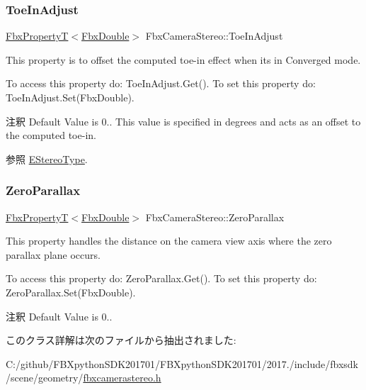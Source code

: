 \subsubsection{\texorpdfstring{Toe\+In\+Adjust}{ToeInAdjust}}
{\footnotesize\ttfamily \hyperlink{class_fbx_property_t}{Fbx\+PropertyT}$<$\hyperlink{fbxtypes_8h_a171e72a1c46fc15c1a6c9c31948c1c5b}{Fbx\+Double}$>$ Fbx\+Camera\+Stereo\+::\+Toe\+In\+Adjust}

This property is to offset the computed toe-\/in effect when it\textquotesingle{}s in Converged mode.

To access this property do\+: Toe\+In\+Adjust.\+Get(). To set this property do\+: Toe\+In\+Adjust.\+Set(\+Fbx\+Double).

\begin{DoxyRemark}{注釈}
Default Value is 0.. This value is specified in degrees and acts as an offset to the computed toe-\/in. 
\end{DoxyRemark}
\begin{DoxySeeAlso}{参照}
\hyperlink{class_fbx_camera_stereo_acb0f27675a73de0858983b703196cb37}{E\+Stereo\+Type}. 
\end{DoxySeeAlso}
\mbox{\label{class_fbx_camera_stereo_ab76f0822d4543864dfe707ea8b3be50a}} 
\subsubsection{\texorpdfstring{Zero\+Parallax}{ZeroParallax}}
{\footnotesize\ttfamily \hyperlink{class_fbx_property_t}{Fbx\+PropertyT}$<$\hyperlink{fbxtypes_8h_a171e72a1c46fc15c1a6c9c31948c1c5b}{Fbx\+Double}$>$ Fbx\+Camera\+Stereo\+::\+Zero\+Parallax}

This property handles the distance on the camera view axis where the zero parallax plane occurs.

To access this property do\+: Zero\+Parallax.\+Get(). To set this property do\+: Zero\+Parallax.\+Set(\+Fbx\+Double).

\begin{DoxyRemark}{注釈}
Default Value is 0.. 
\end{DoxyRemark}


このクラス詳解は次のファイルから抽出されました\+:\begin{DoxyCompactItemize}
\item 
C\+:/github/\+F\+B\+Xpython\+S\+D\+K201701/\+F\+B\+Xpython\+S\+D\+K201701/2017./include/fbxsdk/scene/geometry/\hyperlink{fbxcamerastereo_8h}{fbxcamerastereo.\+h}\end{DoxyCompactItemize}
